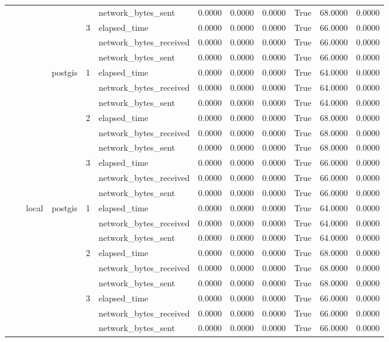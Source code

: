 \begin{tabular}{llllllrrrrrr}
 &  &  &  &  & network_bytes_sent & 0.0000 & 0.0000 & 0.0000 & True & 68.0000 & 0.0000 \\
\cline{5-12}
 &  &  &  & \multirow[t]{3}{*}{3} & elapsed_time & 0.0000 & 0.0000 & 0.0000 & True & 66.0000 & 0.0000 \\
 &  &  &  &  & network_bytes_received & 0.0000 & 0.0000 & 0.0000 & True & 66.0000 & 0.0000 \\
 &  &  &  &  & network_bytes_sent & 0.0000 & 0.0000 & 0.0000 & True & 66.0000 & 0.0000 \\
\cline{4-12} \cline{5-12}
 &  &  & \multirow[t]{9}{*}{postgis} & \multirow[t]{3}{*}{1} & elapsed_time & 0.0000 & 0.0000 & 0.0000 & True & 64.0000 & 0.0000 \\
 &  &  &  &  & network_bytes_received & 0.0000 & 0.0000 & 0.0000 & True & 64.0000 & 0.0000 \\
 &  &  &  &  & network_bytes_sent & 0.0000 & 0.0000 & 0.0000 & True & 64.0000 & 0.0000 \\
\cline{5-12}
 &  &  &  & \multirow[t]{3}{*}{2} & elapsed_time & 0.0000 & 0.0000 & 0.0000 & True & 68.0000 & 0.0000 \\
 &  &  &  &  & network_bytes_received & 0.0000 & 0.0000 & 0.0000 & True & 68.0000 & 0.0000 \\
 &  &  &  &  & network_bytes_sent & 0.0000 & 0.0000 & 0.0000 & True & 68.0000 & 0.0000 \\
\cline{5-12}
 &  &  &  & \multirow[t]{3}{*}{3} & elapsed_time & 0.0000 & 0.0000 & 0.0000 & True & 66.0000 & 0.0000 \\
 &  &  &  &  & network_bytes_received & 0.0000 & 0.0000 & 0.0000 & True & 66.0000 & 0.0000 \\
 &  &  &  &  & network_bytes_sent & 0.0000 & 0.0000 & 0.0000 & True & 66.0000 & 0.0000 \\
\cline{3-12} \cline{4-12} \cline{5-12}
 &  & \multirow[t]{9}{*}{local} & \multirow[t]{9}{*}{postgis} & \multirow[t]{3}{*}{1} & elapsed_time & 0.0000 & 0.0000 & 0.0000 & True & 64.0000 & 0.0000 \\
 &  &  &  &  & network_bytes_received & 0.0000 & 0.0000 & 0.0000 & True & 64.0000 & 0.0000 \\
 &  &  &  &  & network_bytes_sent & 0.0000 & 0.0000 & 0.0000 & True & 64.0000 & 0.0000 \\
\cline{5-12}
 &  &  &  & \multirow[t]{3}{*}{2} & elapsed_time & 0.0000 & 0.0000 & 0.0000 & True & 68.0000 & 0.0000 \\
 &  &  &  &  & network_bytes_received & 0.0000 & 0.0000 & 0.0000 & True & 68.0000 & 0.0000 \\
 &  &  &  &  & network_bytes_sent & 0.0000 & 0.0000 & 0.0000 & True & 68.0000 & 0.0000 \\
\cline{5-12}
 &  &  &  & \multirow[t]{3}{*}{3} & elapsed_time & 0.0000 & 0.0000 & 0.0000 & True & 66.0000 & 0.0000 \\
 &  &  &  &  & network_bytes_received & 0.0000 & 0.0000 & 0.0000 & True & 66.0000 & 0.0000 \\
 &  &  &  &  & network_bytes_sent & 0.0000 & 0.0000 & 0.0000 & True & 66.0000 & 0.0000 \\
\cline{1-12} \cline{2-12} \cline{3-12} \cline{4-12} \cline{5-12}
\bottomrule
\end{tabular}

